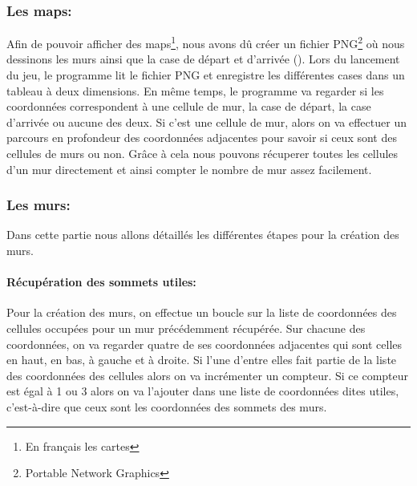 \documentclass[12pt]{report}
\begin{document}
\subsubsection{Les maps:}
Afin de pouvoir afficher des maps\footnote{En français les cartes}, nous avons dû créer un fichier PNG\footnote{Portable Network Graphics} où nous dessinons les murs ainsi que la case de départ et d'arrivée (). Lors du lancement du jeu, le programme lit le fichier PNG et enregistre les différentes cases dans un tableau à deux dimensions. En même temps, le programme va regarder si les coordonnées correspondent à une cellule de mur, la case de départ, la case d'arrivée ou aucune des deux. Si c'est une cellule de mur, alors on va effectuer un parcours en profondeur des coordonnées adjacentes pour savoir si ceux sont des cellules de murs ou non. Grâce à cela nous pouvons récuperer toutes les cellules d'un mur directement et ainsi compter le nombre de mur assez facilement.

\subsubsection{Les murs:}

Dans cette partie nous allons détaillés les différentes étapes pour la création des murs.

\paragraph{Récupération des sommets utiles:}

Pour la création des murs, on effectue un boucle sur la liste de coordonnées des cellules occupées pour un mur précédemment récupérée. Sur chacune des coordonnées, on va regarder quatre de ses coordonnées adjacentes qui sont celles en haut, en bas, à gauche et à droite. Si l'une d'entre elles fait partie de la liste des coordonnées des cellules alors on va incrémenter un compteur. Si ce compteur est égal à 1 ou 3 alors on va l'ajouter dans une liste de coordonnées dites utiles, c'est-à-dire que ceux sont les coordonnées des sommets des murs.
\end{document}
